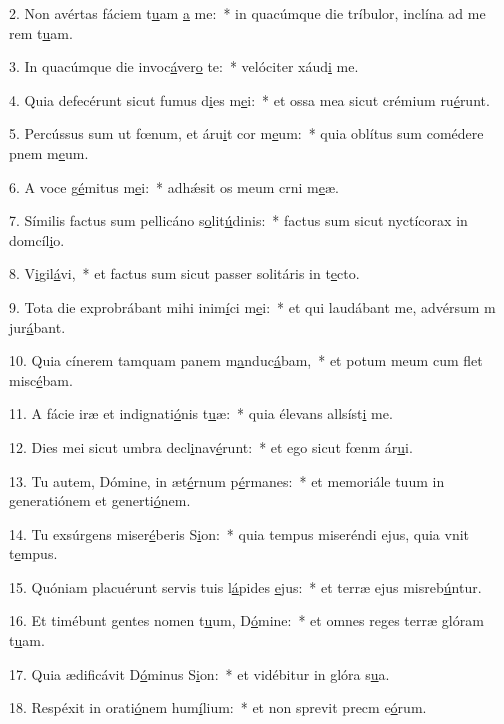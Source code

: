 2. Non avértas fáciem t\uline{u}am \uline{a} me:~* in quacúmque die tríbulor, inclína ad me rem t\uline{u}am.\par 
3. In quacúmque die invoc\uline{á}ver\uline{o} te:~* velóciter xáud\uline{i} me.\par 
4. Quia defecérunt sicut fumus d\uline{i}es m\uline{e}i:~* et ossa mea sicut crémium ru\uline{é}runt.\par 
5. Percússus sum ut fœnum, et áru\uline{i}t cor m\uline{e}um:~* quia oblítus sum comédere pnem m\uline{e}um.\par 
6. A voce g\uline{é}mitus m\uline{e}i:~* adhǽsit os meum crni m\uline{e}æ.\par 
7. Símilis factus sum pellicáno s\uline{o}lit\uline{ú}dinis:~* factus sum sicut nyctícorax in domcíl\uline{i}o.\par 
8. V\uline{i}gil\uline{á}vi,~* et factus sum sicut passer solitáris in t\uline{e}cto.\par 
9. Tota die exprobrábant mihi inim\uline{í}ci m\uline{e}i:~* et qui laudábant me, advérsum m jur\uline{á}bant.\par 
10. Quia cínerem tamquam panem m\uline{a}nduc\uline{á}bam,~* et potum meum cum flet misc\uline{é}bam.\par 
11. A fácie iræ et indignati\uline{ó}nis t\uline{u}æ:~* quia élevans allsíst\uline{i} me.\par 
12. Dies mei sicut umbra decl\uline{i}nav\uline{é}runt:~* et ego sicut fœnm ár\uline{u}i.\par 
13. Tu autem, Dómine, in æt\uline{é}rnum p\uline{é}rmanes:~* et memoriále tuum in generatiónem et generti\uline{ó}nem.\par 
14. Tu exsúrgens miser\uline{é}beris S\uline{i}on:~* quia tempus miseréndi ejus, quia vnit t\uline{e}mpus.\par 
15. Quóniam placuérunt servis tuis l\uline{á}pides \uline{e}jus:~* et terræ ejus misreb\uline{ú}ntur.\par 
16. Et timébunt gentes nomen t\uline{u}um, D\uline{ó}mine:~* et omnes reges terræ glóram t\uline{u}am.\par 
17. Quia ædificávit D\uline{ó}minus S\uline{i}on:~* et vidébitur in glóra s\uline{u}a.\par 
18. Respéxit in orati\uline{ó}nem hum\uline{í}lium:~* et non sprevit precm e\uline{ó}rum.\par 
